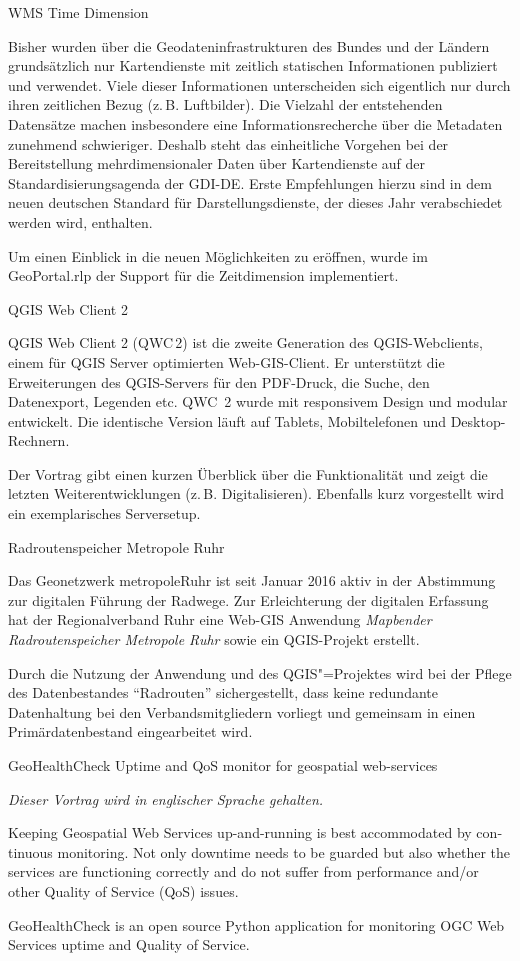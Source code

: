 %
{WMS Time Dimension}%
{}%
{
Bisher wurden über die Geodateninfrastrukturen des Bundes und der Ländern
grundsätzlich nur Kartendienste mit zeitlich statischen Informationen
publiziert und verwendet. Viele dieser Informationen
unterscheiden sich eigentlich nur durch ihren zeitlichen Bezug (z.\,B. Luftbilder). Die Vielzahl
der entstehenden Datensätze machen insbesondere eine Informationsrecherche über
die Metadaten zunehmend schwieriger. Deshalb steht das
einheitliche Vorgehen bei der Bereitstellung mehrdimensionaler Daten über
Kartendienste auf der Standardisierungsagenda der GDI-DE. Erste Empfehlungen
hierzu sind in dem neuen deutschen Standard für Darstellungsdienste, der dieses Jahr 
verabschiedet werden wird, enthalten.

Um einen Einblick in die neuen Möglichkeiten zu eröffnen, wurde im
GeoPortal.rlp der Support für die Zeitdimension implementiert.%
}

%
{QGIS Web Client 2}%
{}%
{
QGIS Web Client 2 (QWC\,2) ist die zweite Generation des QGIS-Webclients, einem für QGIS Server
optimierten Web-GIS-Client. Er unterstützt die Erweiterungen des QGIS-Servers für den PDF-Druck, die Suche,
den Datenexport, Legenden etc. QWC~2 wurde mit responsivem Design und modular entwickelt. Die identische
Version läuft auf Tablets, Mobiltelefonen und Desktop-Rechnern.

Der Vortrag gibt einen kurzen Überblick über die Funktionalität und zeigt die letzten
Weiterentwicklungen (z.\,B. Digitalisieren). Ebenfalls kurz vorgestellt wird ein exemplarisches
Serversetup.%
}


%
{Radroutenspeicher Metropole Ruhr}%
{}%
{
Das Geonetzwerk metropoleRuhr ist seit Januar 2016 aktiv in der Abstimmung zur digitalen
Führung der Radwege. Zur Erleichterung der digitalen Erfassung hat der Regionalverband
Ruhr eine Web-GIS Anwendung \emph{Mapbender Radroutenspeicher Metropole Ruhr} sowie ein
QGIS-Projekt erstellt.

Durch die Nutzung der Anwendung und des QGIS"=Projektes wird bei der Pflege
des Datenbestandes "`Radrouten"' sichergestellt, dass keine redundante Datenhaltung bei den
Verbandsmitgliedern vorliegt und gemeinsam in einen Primärdatenbestand eingearbeitet wird.%
}

%
{GeoHealthCheck}%
{Uptime and QoS monitor for geospatial web-services}%
{
  \emph{Dieser Vortrag wird in englischer Sprache gehalten.}

  \begin{otherlanguage}{english}
    Keeping Geospatial Web Services up-and-running is best accommodated by continuous monitoring.  Not
    only downtime needs to be guarded but also whether the services are functioning correctly and do not
    suffer from performance and/or other Quality of Service (QoS) issues.

    GeoHealthCheck is an open source Python application for monitoring OGC Web Services
    uptime and Quality of Service.
  \end{otherlanguage}%
}

